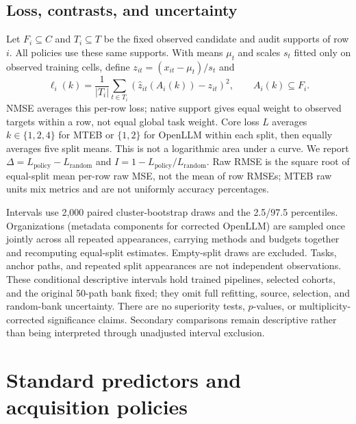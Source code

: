 \documentclass{article}
\begin{document}
\subsection{Loss, contrasts, and uncertainty}\label{sec:uncertainty}
Let $F_i\subseteq C$ and $T_i\subseteq T$ be the fixed observed candidate and audit supports of row $i$. All policies use these same supports. With means $\mu_t$ and scales $s_t$ fitted only on observed training cells, define $z_{it}=(x_{it}-\mu_t)/s_t$ and
\begin{equation}
 \ell_i(k)=\frac{1}{|T_i|}\sum_{t\in T_i}(\widehat z_{it}(A_i(k))-z_{it})^2,\qquad A_i(k)\subseteq F_i.
 \label{eq:loss}
\end{equation}
NMSE averages this per-row loss; native support gives equal weight to observed targets within a row, not equal global task weight. Core loss $L$ averages $k\in\{1,2,4\}$ for MTEB or $\{1,2\}$ for OpenLLM within each split, then equally averages five split means. This is not a logarithmic area under a curve. We report $\Delta=L_{\mathrm{policy}}-L_{\mathrm{random}}$ and $I=1-L_{\mathrm{policy}}/L_{\mathrm{random}}$. Raw RMSE is the square root of equal-split mean per-row raw MSE, not the mean of row RMSEs; MTEB raw units mix metrics and are not uniformly accuracy percentages.

Intervals use 2,000 paired cluster-bootstrap draws and the 2.5/97.5 percentiles. Organizations (metadata components for corrected OpenLLM) are sampled once jointly across all repeated appearances, carrying methods and budgets together and recomputing equal-split estimates. Empty-split draws are excluded. Tasks, anchor paths, and repeated split appearances are not independent observations. These conditional descriptive intervals hold trained pipelines, selected cohorts, and the original 50-path bank fixed; they omit full refitting, source, selection, and random-bank uncertainty. There are no superiority tests, $p$-values, or multiplicity-corrected significance claims. Secondary comparisons remain descriptive rather than being interpreted through unadjusted interval exclusion.

\section{Standard predictors and acquisition policies}\label{sec:method}
\end{document}
